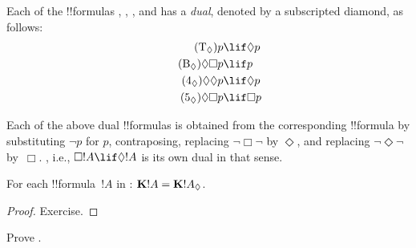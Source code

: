 \documentclass[../../../include/open-logic-section]{subfiles}
\begin{document}


\begin{defn}
  Each of the !!{formula}s , , , and
   has a \emph{dual}, denoted by a subscripted diamond, as
  follows:
  \begin{align}
    \tag{\Ax{T_\Diamond}} p & \lif \Diamond p\\
    \tag{\Ax{B_\Diamond}} \Diamond\Box p & \lif p\\
    \tag{\Ax{4_\Diamond}} \Diamond\Diamond p & \lif \Diamond p\\
    \tag{\Ax{5_\Diamond}} \Diamond\Box p & \lif \Box p
    \end{align}
\end{defn}

Each of the above dual !!{formula}s is obtained from the corresponding
!!{formula} by substituting $\lnot p$ for $p$, contraposing, replacing
$\lnot\Box\lnot$ by $\Diamond$, and replacing $\lnot\Diamond\lnot$
by~$\Box$. , i.e., $\Box!A \lif \Diamond!A$ is its own dual in
that sense.

\begin{prop}
  For each !!{formula}~$!A$ in :
  $\Log{K}!A = \Log{K}! A_{\Diamond}$.
\end{prop}
\begin{proof}
  Exercise.
\end{proof}
\begin{prob}
  Prove .
\end{prob}
\end{document}
